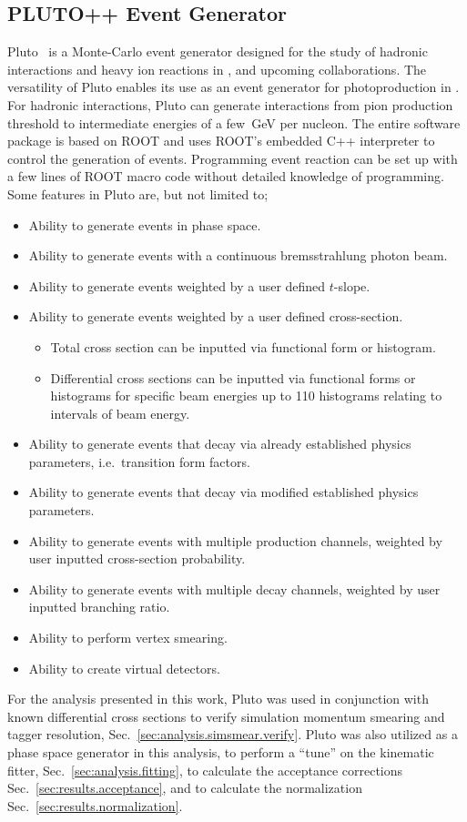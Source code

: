 \subsection{PLUTO++ Event Generator}\label{sec:pluto}

Pluto~\cite{PLUTO} is a Monte-Carlo event generator designed for the study of hadronic interactions and heavy ion reactions in ,  and upcoming  collaborations. The versatility of Pluto enables its use as an event generator for photoproduction in . For hadronic interactions, Pluto can generate interactions from pion production threshold to intermediate energies of a few~GeV per nucleon. The entire software package is based on ROOT and uses ROOT's embedded C++ interpreter to control the generation of events. Programming event reaction can be set up with a few lines of ROOT macro code without detailed knowledge of programming. Some features in Pluto are, but not limited to;
\begin{itemize}
	\item Ability to generate events in phase space.
	\item Ability to generate events with a continuous bremsstrahlung photon beam.
	\item Ability to generate events weighted by a user defined $t$-slope.
	\item Ability to generate events weighted by a user defined cross-section.
	\begin{itemize}
		\item Total cross section can be inputted via functional form or histogram.
		\item Differential cross sections can be inputted via functional forms or histograms for specific beam energies up to 110 histograms relating to intervals of beam energy.
	\end{itemize}
	\item Ability to generate events that decay via already established physics parameters, i.e.~transition form factors.
	\item Ability to generate events that decay via modified established physics parameters.
	\item Ability to generate events with multiple production channels, weighted by user inputted cross-section probability.
	\item Ability to generate events with multiple decay channels, weighted by user inputted branching ratio.
	\item Ability to perform vertex smearing.
	\item Ability to create virtual detectors.
\end{itemize}

For the analysis presented in this work, Pluto was used in conjunction with known differential cross sections to verify simulation momentum smearing and tagger resolution, Sec.~\ref{sec:analysis.simsmear.verify}. Pluto was also utilized as a phase space generator in this analysis, to perform a ``tune'' on the kinematic fitter, Sec.~\ref{sec:analysis.fitting}, to calculate the acceptance corrections Sec.~\ref{sec:results.acceptance}, and to calculate the normalization Sec.~\ref{sec:results.normalization}.
